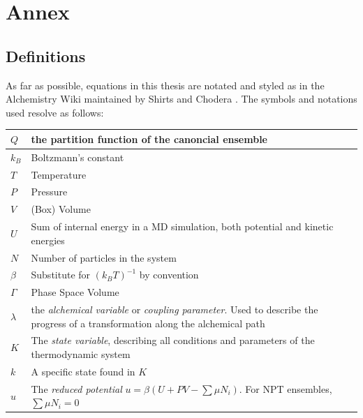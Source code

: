 \documentclass[oneside]{scrreprt}
\begin{document}
\chapter{Annex}
\section{Definitions}
As far as possible, equations in this thesis are notated and styled as in the Alchemistry Wiki maintained by Shirts and Chodera \cite{shirts_alchemistrywiki_nodate}. The symbols and notations used resolve as follows:
\begin{center}
    

\begin{tabular}{ | m{3cm} | m{10cm}| }
\hline
$Q$ & the partition function of the canoncial ensemble \\
\hline
$k_B$ & Boltzmann's constant\\
\hline
$T$ & Temperature \\
\hline
$P$ & Pressure \\
\hline
$V$ & (Box) Volume\\
\hline
$U$ & Sum of internal energy in a MD simulation, both potential and kinetic energies\\
\hline
$N$ & Number of particles in the system\\
\hline
$\beta$ & Substitute for $(k_B T)^{-1}$ by convention \\
\hline
$\Gamma$ & Phase Space Volume \\
\hline
$\lambda$ & the \emph{alchemical variable} or \emph{coupling parameter}. Used to describe the progress of a transformation along the alchemical path\\
\hline
$K$ & The \emph{state variable}, describing all conditions and parameters of the thermodynamic system\\
\hline
$k$ & A specific state found in $K$\\
\hline
$u$ & The \emph{reduced potential} $u=\beta(U+PV-\sum{\mu N_i}) $. For NPT ensembles, $\sum{\mu N_i} = 0$\\
\hline
\end{tabular}
\end{center}
\listoffigures

\listoftables

\printbibliography[title={References}]%
\end{document}
